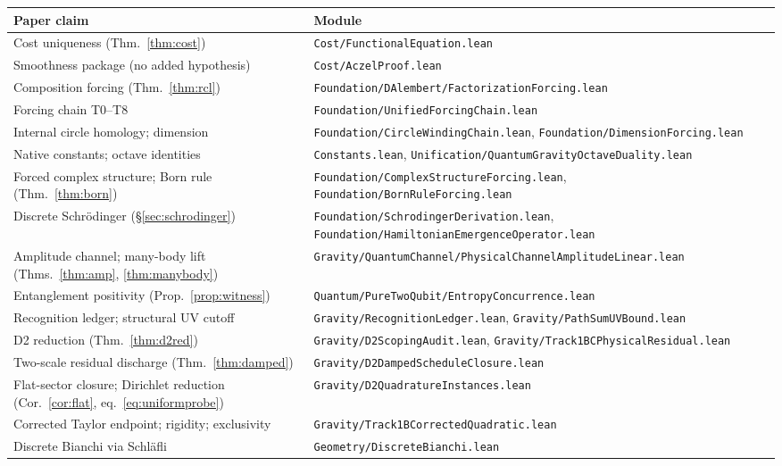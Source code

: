 \documentclass[11pt,letterpaper]{article}
\theoremstyle{definition}
\begin{document}
\begin{center}
\small
\begin{tabular}{@{}ll@{}}
\toprule
Paper claim & Module \\
\midrule
Cost uniqueness (Thm.~\ref{thm:cost})
& \texttt{Cost/FunctionalEquation.lean} \\
Smoothness package (no added hypothesis)
& \texttt{Cost/AczelProof.lean} \\
Composition forcing (Thm.~\ref{thm:rcl})
& \texttt{Foundation/DAlembert/FactorizationForcing.lean} \\
Forcing chain T0--T8
& \texttt{Foundation/UnifiedForcingChain.lean} \\
Internal circle homology; dimension
& \texttt{Foundation/CircleWindingChain.lean},
\texttt{Foundation/DimensionForcing.lean} \\
Native constants; octave identities
& \texttt{Constants.lean},
\texttt{Unification/QuantumGravityOctaveDuality.lean} \\
Forced complex structure; Born rule (Thm.~\ref{thm:born})
& \texttt{Foundation/ComplexStructureForcing.lean},
\texttt{Foundation/BornRuleForcing.lean} \\
Discrete Schr\"odinger (\S\ref{sec:schrodinger})
& \texttt{Foundation/SchrodingerDerivation.lean},
\texttt{Foundation/HamiltonianEmergenceOperator.lean} \\
Amplitude channel; many-body lift (Thms.~\ref{thm:amp},
\ref{thm:manybody})
& \texttt{Gravity/QuantumChannel/PhysicalChannelAmplitudeLinear.lean} \\
Entanglement positivity (Prop.~\ref{prop:witness})
& \texttt{Quantum/PureTwoQubit/EntropyConcurrence.lean} \\
Recognition ledger; structural UV cutoff
& \texttt{Gravity/RecognitionLedger.lean},
\texttt{Gravity/PathSumUVBound.lean} \\
D2 reduction (Thm.~\ref{thm:d2red})
& \texttt{Gravity/D2ScopingAudit.lean},
\texttt{Gravity/Track1BCPhysicalResidual.lean} \\
Two-scale residual discharge (Thm.~\ref{thm:damped})
& \texttt{Gravity/D2DampedScheduleClosure.lean} \\
Flat-sector closure; Dirichlet reduction (Cor.~\ref{cor:flat},
eq.~\eqref{eq:uniformprobe})
& \texttt{Gravity/D2QuadratureInstances.lean} \\
Corrected Taylor endpoint; rigidity; exclusivity
& \texttt{Gravity/Track1BCorrectedQuadratic.lean} \\
Discrete Bianchi via Schl\"afli
& \texttt{Geometry/DiscreteBianchi.lean} \\

\end{tabular}
\end{center}
\end{document}
